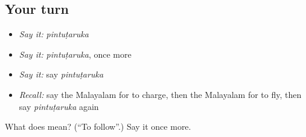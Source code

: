 \subsection*{Your turn}
\begin{itemize}
\raggedright
  \item \emph{Say it:} \emph{pintuṭaruka}
  \item \emph{Say it:} \emph{pintuṭaruka}, once more
  \item \emph{Say it:} say \emph{pintuṭaruka}
  \item \emph{Recall:} say the Malayalam for to charge, then the Malayalam for to fly, then say \emph{pintuṭaruka} again
\end{itemize}

\begin{tcolorbox}[breakable,colback=teal!4,colframe=teal!35!black,title={Before you move on}]
What does  mean? (\textquotedblleft{}To follow\textquotedblright{}.) Say it once more.
\end{tcolorbox}
